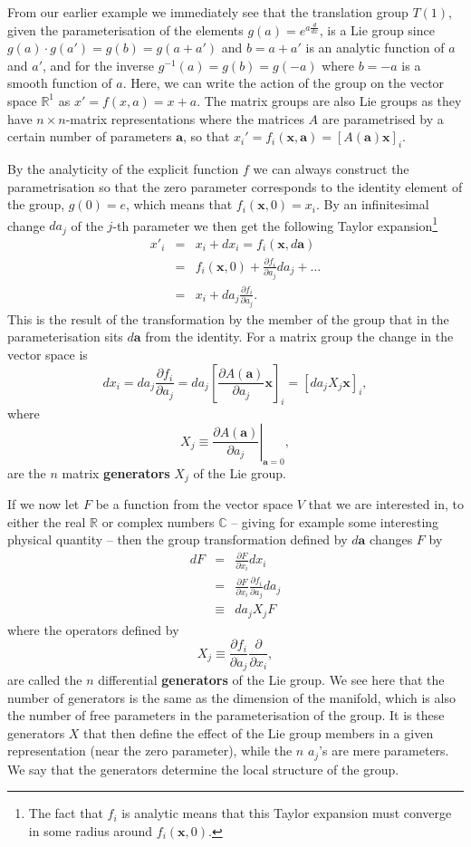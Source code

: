 \documentclass[notes.tex]{subfiles}
\begin{document}
From our earlier example we immediately see that the translation group $T(1)$, given the parameterisation of the elements $g(a) = e^{a\frac{d}{dx}}$, is a Lie group since $g(a)\cdot g(a') =g(b)= g(a+a')$ and $b=a+a'$ is an analytic function of $a$ and $a'$, and for the inverse $g^{-1}(a)=g(b)=g(-a)$ where $b=-a$ is a smooth function of $a$. Here, we can write the action of the group on the vector space $\mathbb{R}^1$ as $x'=f(x,a) = x+a$. The matrix groups are also Lie groups as they have $n\times n$-matrix representations where the matrices $A$ are parametrised by a certain number of parameters $\mathbf a$,  so that $x_i'=f_i(\mathbf{x}, \mathbf a) = [A(\mathbf a)\mathbf{x}]_i$. 

By the analyticity of the explicit function $f$ we can always construct the parametrisation so that the zero parameter corresponds to the identity element of the group, $g(0) = e$, which means that  $f_i(\mathbf x, 0)=x_i$. By an infinitesimal change $da_j$ of the $j$-th parameter we then get the following Taylor expansion\footnote{The fact that $f_i$ is analytic means that this Taylor expansion must converge in some radius around $f_i(\mathbf x,0)$.}
\begin{eqnarray*}
x'_i &=& x_i + dx_i = f_i(\mathbf x, d\mathbf a)\\
&=& f_i(\mathbf x, 0) + \frac{\partial f_i}{\partial a_j}da_j +\ldots\\
&=& x_i +da_j \frac{\partial f_i}{\partial a_j}.
\end{eqnarray*}
This is the result of the transformation by the member of the group that in the parameterisation sits $d\mathbf a$ from the identity. For a matrix group the change in the vector space is
\[
dx_i=da_j\frac{\partial f_i}{\partial a_j}=da_j\left[\frac{\partial A(\mathbf a)}{\partial a_j}\mathbf{x}\right]_i=[da_jX_j\mathbf{x}]_i,
\]
where 
\[
X_j\equiv \left. \frac{\partial A(\mathbf a)}{\partial a_j}\right|_{\mathbf a=0} ,
\]
are the $n$ matrix {\bf generators} $X_j$ of the Lie group.

If we now let $F$ be a function from the vector space $V$ that we are interested in, to either the real $\mathbb{R}$ or complex numbers $\mathbb{C}$ -- giving for example some interesting physical quantity -- then the group transformation defined by $d\mathbf a$ changes $F$ by
\begin{eqnarray*}
dF &=& \frac{\partial F}{\partial x_i}dx_i\\
&=& \frac{\partial F}{\partial x_i}\frac{\partial f_i}{\partial a_j}da_j\\
&\equiv& da_j X_j F
\end{eqnarray*}
where the operators defined by \[X_j \equiv\frac{\partial f_i}{\partial a_j} \frac{\partial }{\partial x_i},\] are called the $n$ differential {\bf generators} of the Lie group. We see here that the number of generators is the same as the dimension of the manifold, which is also the number of free parameters in the parameterisation of the group. 
It is these generators $X$ that then define the effect of the Lie group members in a given representation (near the zero parameter), while the $n$ $a_j$'s are mere parameters. We say that the generators determine the local structure of the group.
\end{document}
